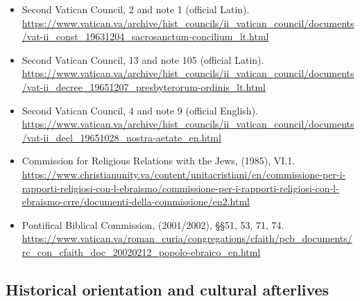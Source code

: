 \begin{itemize}[leftmargin=1.2em, itemsep=0.15em]
\item Second Vatican Council,  2 and note 1
(official Latin).
\url{https://www.vatican.va/archive/hist_councils/ii_vatican_council/documents/vat-ii_const_19631204_sacrosanctum-concilium_lt.html}
\item Second Vatican Council,  13 and note 105
(official Latin).
\url{https://www.vatican.va/archive/hist_councils/ii_vatican_council/documents/vat-ii_decree_19651207_presbyterorum-ordinis_lt.html}
\item Second Vatican Council,  4 and note 9 (official
English).
\url{https://www.vatican.va/archive/hist_councils/ii_vatican_council/documents/vat-ii_decl_19651028_nostra-aetate_en.html}
\item Commission for Religious Relations with the Jews, 
(1985), VI.1.
\url{https://www.christianunity.va/content/unitacristiani/en/commissione-per-i-rapporti-religiosi-con-l-ebraismo/commissione-per-i-rapporti-religiosi-con-l-ebraismo-crre/documenti-della-commissione/en2.html}
\item Pontifical Biblical Commission,  (2001/2002), §§51, 53, 71, 74.
\url{https://www.vatican.va/roman_curia/congregations/cfaith/pcb_documents/rc_con_cfaith_doc_20020212_popolo-ebraico_en.html}
\end{itemize}

\subsection*{Historical orientation and cultural afterlives}

